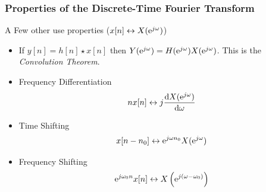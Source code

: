 \documentclass[mathserif,9pt,handout]{beamer}
\def\d{\mathrm{d}}
\begin{document}
\begin{frame}\frametitle{Properties of the Discrete-Time Fourier Transform}\small
  \begin{block}{\small A Few other use properties ($x[n] \leftrightarrow X({\textrm{e}}^{j\omega})$)}
    \begin{itemize}
      \item If $y[n] = h[n] \star x[n]$ then $Y({\textrm{e}}^{j\omega}) = H({\textrm{e}}^{j\omega}) X({\textrm{e}}^{j\omega})$. This is the {\em Convolution Theorem}. 
      \item Frequency Differentiation%
        \begin{align}
          n x[n] \leftrightarrow j \frac{\d X(\e^{j\omega})}{\d\omega}
          \nonumber
        \end{align}
      \item Time Shifting
        \begin{align}
          x[n-n_0] \leftrightarrow {\textrm{e}}^{j\omega n_0} X({\textrm{e}}^{j\omega})
          \nonumber
        \end{align}
      \item Frequency Shifting 
        \begin{align}
          {\textrm{e}}^{j\omega_0 n} x[n] \leftrightarrow  X\left({\textrm{e}}^{j(\omega - \omega_0)}\right)
          \nonumber
        \end{align}
    \end{itemize}
  \end{block}
\end{frame}
\end{document}

